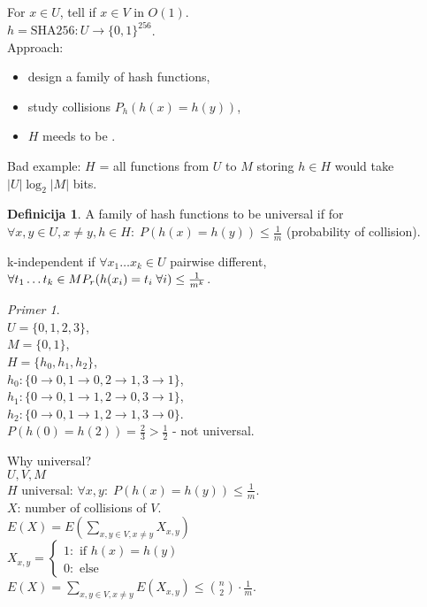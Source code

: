\documentclass[a4paper, 12pt]{book}
\theoremstyle{definition}
\newtheorem{defn}[counter]{Definicija}
\theoremstyle{remark}
\newtheorem*{ex}{Primer}
\begin{document}
For $x \in U$, tell if $x \in V$ in $O(1)$. \\
$h = \text{SHA256}: U \to \{0, 1\}^{256}$. \\
Approach:
\begin{itemize}
  \item design a family of hash functions,
  \item study collisions $P_h(h(x) = h(y))$,
  \item $H$ meeds to be .
\end{itemize}
Bad example: $H$ = all functions from $U$ to $M$ storing $h \in H$ would take $|U| \log_2 |M|$ bits.
\begin{defn}
  A family of hash functions to be universal if for \\
  $\forall x, y \in U, x \neq y, h \in H: \; P(h(x) = h(y)) \leq \frac{1}{m}$ (probability of collision).
\end{defn}
k-independent if $\forall x_1 \dots x_k \in U$ pairwise different, $\forall t_1 \dots t_k \in M \\
P_r(h(x_i) = t_i \; \forall i) \leq \frac{1}{m^k}$.
\begin{ex} \text{} \\
  $U = \{0, 1, 2, 3\}$, \\
  $M = \{0, 1\}$, \\
  $H = \{h_0, h_1, h_2\}$, \\
  $h_0: \{0 \to 0, 1 \to 0, 2 \to 1, 3 \to 1\}$, \\
  $h_1: \{0 \to 0, 1 \to 1, 2 \to 0, 3 \to 1\}$, \\
  $h_2: \{0 \to 0, 1 \to 1, 2 \to 1, 3 \to 0\}$. \\
  $P(h(0) = h(2)) = \frac{2}{3} > \frac{1}{2}$ - not universal.
\end{ex}
Why universal? \\
$U, V, M$ \\
$H$ universal: $\forall x, y: \; P(h(x) = h(y)) \leq \frac{1}{m}$. \\
$X$: number of collisions of $V$. \\
$E(X) = E\left(\sum_{x,y \in V, x \neq y} X_{x,y}\right)$ \\
$X_{x,y} = \begin{cases}
  1: \text{ if } h(x) = h(y) \\
  0: \text{ else}
\end{cases}$ \\
$E(X) = \sum_{x,y \in V, x \neq y} E(X_{x,y}) \leq \binom{n}{2} \cdot \frac{1}{m}$. \\
\end{document}
